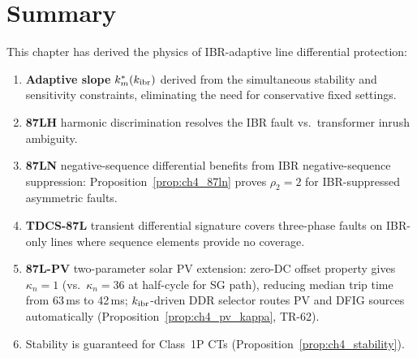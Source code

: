 \section{Summary}
\label{sec:ch4_summary}

This chapter has derived the physics of IBR-adaptive line differential
protection:
\begin{enumerate}
\item \textbf{Adaptive slope} $k_m^\ast(k_{\mathrm{ibr}})$ derived from the
      simultaneous stability and sensitivity constraints, eliminating
      the need for conservative fixed settings.
\item \textbf{87LH} harmonic discrimination resolves the IBR fault vs.\
      transformer inrush ambiguity.
\item \textbf{87LN} negative-sequence differential benefits from IBR
      negative-sequence suppression: Proposition~\ref{prop:ch4_87ln}
      proves $\rho_2 = 2$ for IBR-suppressed asymmetric faults.
\item \textbf{TDCS-87L} transient differential signature covers three-phase
      faults on IBR-only lines where sequence elements provide no coverage.
\item \textbf{87L-PV} two-parameter solar PV extension: zero-DC offset property
      gives $\kappa_n = 1$ (vs.\ $\kappa_n = 36$ at half-cycle for SG path),
      reducing median trip time from 63\,ms to 42\,ms; $k_{\rm ibr}$-driven
      DDR selector routes PV and DFIG sources automatically
      (Proposition~\ref{prop:ch4_pv_kappa}, TR-62).
\item Stability is guaranteed for Class~1P CTs (Proposition~\ref{prop:ch4_stability}).
\end{enumerate}
